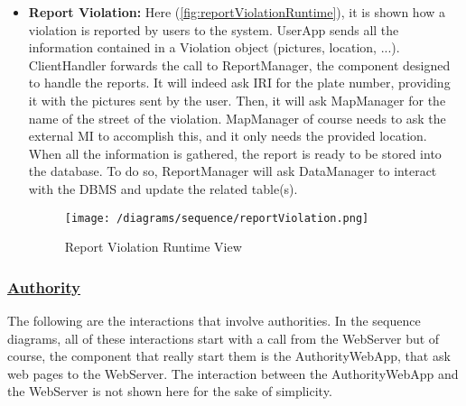 \begin{itemize}
				\item \textbf{Report Violation:} Here (\autoref{fig:reportViolationRuntime}), it is shown how a violation is reported by users to the system. UserApp sends all the information contained in a Violation object (pictures, location, ...). ClientHandler forwards the call to ReportManager, the component designed to handle the reports. It will indeed ask IRI for the plate number, providing it with the pictures sent by the user. Then, it will ask MapManager for the name of the street of the violation. MapManager of course needs to ask the external MI to accomplish this, and it only needs the provided location. When all the information is gathered, the report is ready to be stored into the database. To do so, ReportManager will ask DataManager to interact with the DBMS and update the related table(s).
				
				\begin{figure}[h!]
					\centering
					\texttt{[image: /diagrams/sequence/reportViolation.png]}
					\caption{\label{fig:reportViolationRuntime} Report Violation Runtime View}
				\end{figure}
			\end{itemize}
		
		\subsubsection[Authority]{\hyperlink{toc}{Authority}}
			\label{sec:authorityRuntimeView}
			
			The following are the interactions that involve authorities. In the sequence diagrams, all of these interactions start with a call from the WebServer but of course, the component that really start them is the AuthorityWebApp, that ask web pages to the WebServer. The interaction between the AuthorityWebApp and the WebServer is not shown here for the sake of simplicity.
			
